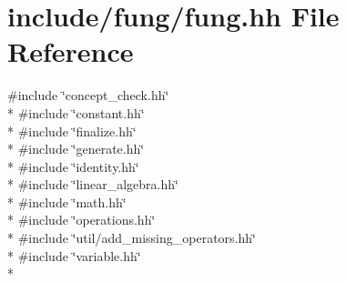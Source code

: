 \hypertarget{fung_8hh}{}\section{include/fung/fung.hh File Reference}
\label{fung_8hh}
{\ttfamily \#include \char`\"{}concept\+\_\+check.\+hh\char`\"{}}\\*
{\ttfamily \#include \char`\"{}constant.\+hh\char`\"{}}\\*
{\ttfamily \#include \char`\"{}finalize.\+hh\char`\"{}}\\*
{\ttfamily \#include \char`\"{}generate.\+hh\char`\"{}}\\*
{\ttfamily \#include \char`\"{}identity.\+hh\char`\"{}}\\*
{\ttfamily \#include \char`\"{}linear\+\_\+algebra.\+hh\char`\"{}}\\*
{\ttfamily \#include \char`\"{}math.\+hh\char`\"{}}\\*
{\ttfamily \#include \char`\"{}operations.\+hh\char`\"{}}\\*
{\ttfamily \#include \char`\"{}util/add\+\_\+missing\+\_\+operators.\+hh\char`\"{}}\\*
{\ttfamily \#include \char`\"{}variable.\+hh\char`\"{}}\\*

